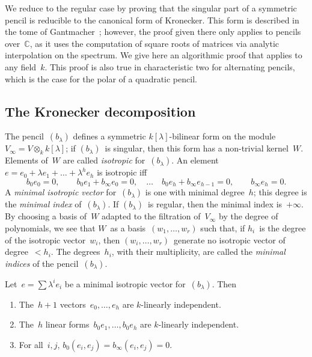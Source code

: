 \documentclass{article}%
\begin{document}
We reduce to the regular case by proving that the singular part of a
symmetric pencil is reducible to the canonical form of Kronecker.
This form is described in the tome of Gantmacher~\cite[XII(56)]{Gantmacher};
however, the proof given there only applies to pencils over~$ℂ$,
as it uses the computation of square roots of matrices
via analytic interpolation on the spectrum.
We give here an algorithmic proof that applies to any field~$k$.
This proof is also true in characteristic two for alternating pencils,
which is the case for the polar of a quadratic pencil.

\subsection{The Kronecker decomposition} %
\label{SS:Kronecker-reduction}
The pencil~$(b_{λ})$ defines a symmetric $k[λ]$-bilinear form on the
module~$V_{∞} = V ⊗_{k} k[λ]$; if $(b_{λ})$~is singular, then this form
has a non-trivial kernel~$W$. Elements of~$W$ are called \emph{isotropic}
for~$(b_{λ})$. An element~$e = e_0 + λ e_1 + … + λ^h e_h$ is isotropic iff
\begin{equation}\label{eq:isotropic}
b_0 e_0 = 0, \qquad
b_0 e_1 + b_{∞} e_0 = 0, \quad … \quad
b_0 e_h + b_{∞} e_{h-1} = 0, \qquad
b_{∞} e_{h} = 0.
\end{equation}
A \emph{minimal isotropic vector} for~$(b_{λ})$ is one with minimal
degree~$h$; this degree is the \emph{minimal index} of~$(b_{λ})$. If
$(b_{λ})$~is regular, then the minimal index is~$+∞$.
By choosing a basis of~$W$
adapted to the filtration of~$V_{∞}$ by the degree of polynomials, we see
that $W$~as a basis~$(w_1, …,w_r)$ such that, if $h_i$~is the degree of
the isotropic vector~$w_i$, then $(w_i, …,w_r)$~generate no isotropic
vector of degree~$< h_i$. The degrees~$h_i$, with their multiplicity,
are called the \emph{minimal indices} of the pencil~$(b_{λ})$.
\begin{prop}\label{prop:minimal-indep}%
Let~$e = ∑ λ^i e_i$ be a minimal isotropic vector for~$(b_{λ})$. Then
\begin{enumerate}
\item The~$h+1$ vectors~$e_0, …, e_h$ are $k$-linearly independent.
\item The~$h$ linear forms~$b_{0} e_1, …, b_{0} e_h$ are $k$-linearly
independent.
\item For all~$i, j$, $b_{0}(e_i, e_j) = b_{∞}(e_i, e_j) = 0$.
\end{enumerate}
\end{prop}
\end{document}

